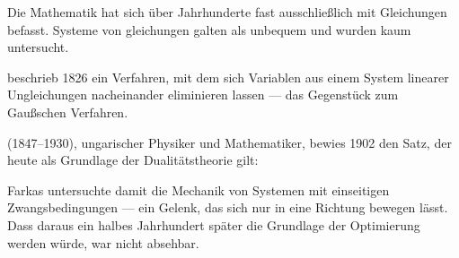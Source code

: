 \begin{geschichte}
Die Mathematik hat sich über Jahrhunderte fast ausschließlich mit Gleichungen befasst. Systeme von gleichungen galten als unbequem und wurden kaum untersucht.

 beschrieb 1826 ein Verfahren, mit dem sich Variablen aus einem System linearer Ungleichungen nacheinander eliminieren lassen --- das Gegenstück zum Gaußschen Verfahren.

\begin{center}
\begin{minipage}{0.9\textwidth}
\end{minipage}
\end{center}

 (1847--1930), ungarischer Physiker und Mathematiker, bewies 1902 den Satz, der heute als Grundlage der Dualitätstheorie gilt:

\begin{center}
\begin{minipage}{0.9\textwidth}
\end{minipage}
\end{center}

Farkas untersuchte damit die Mechanik von Systemen mit einseitigen Zwangsbedingungen --- ein Gelenk, das sich nur in eine Richtung bewegen lässt. Dass daraus ein halbes Jahrhundert später die Grundlage der Optimierung werden würde, war nicht absehbar.

\begin{center}
\begin{minipage}{0.9\textwidth}
\end{minipage}
\end{center}


\end{geschichte}
